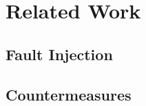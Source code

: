 \section{Related Work}\label{sub:faultCounter}
\subsection{Fault Injection}
\subsection{Countermeasures}\label{subsec:countermeasures}


